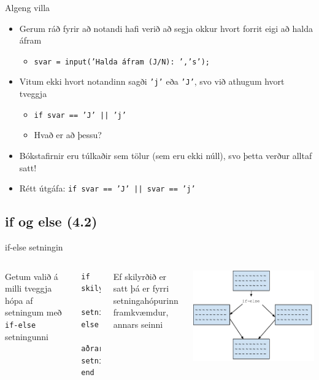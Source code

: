 \documentclass{beamer}
\begin{document}
\begin{frame}{Algeng villa}
\begin{itemize}
 \item Gerum ráð fyrir að notandi hafi verið að segja okkur hvort forrit eigi að halda áfram
 \begin{itemize}
  \item \texttt{svar = input('Halda áfram (J/N): ','s');}
 \end{itemize}
 \item Vitum ekki hvort notandinn sagði \texttt{'j'} eða \texttt{'J'}, svo við athugum hvort tveggja
 \begin{itemize}
  \item \texttt{if svar == 'J' || 'j'}
  \item Hvað er að þessu? \pause
 \end{itemize}
 \item Bókstafirnir eru túlkaðir sem tölur (sem eru ekki núll), svo þetta verður alltaf satt!
 \item Rétt útgáfa: \texttt{if svar == 'J' || svar == 'j'}
\end{itemize}
\end{frame}

\subsection{if og else (4.2)}

\begin{frame}[fragile]{if-else setningin}
\begin{columns}
Getum valið á milli tveggja hópa af setningum með \texttt{if-else} setningunni
\begin{verbatim}
if skilyrði
    setningar
else
    aðrar setningar
end
\end{verbatim}
Ef skilyrðið er satt þá er fyrri setningahópurinn framkvæmdur, annars seinni
\begin{center}
 \includegraphics[width=\linewidth]{Pics/if-else}
\end{center}
\end{columns}
\end{frame}
\end{document}
